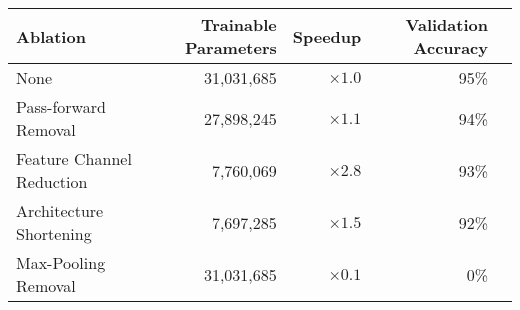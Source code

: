 \begin{tabular}{@{}lrrrr@{}}
\toprule
Ablation                  & Trainable Parameters & Speedup     & Validation Accuracy \\ \midrule
None                      & 31,031,685           & $\times1.0$ & 95\%                \\
Pass-forward Removal      & 27,898,245           & $\times1.1$ & 94\%                \\
Feature Channel Reduction & 7,760,069            & $\times2.8$ & 93\%                \\
Architecture Shortening   & 7,697,285            & $\times1.5$ & 92\%                \\
Max-Pooling Removal       & 31,031,685           & $\times0.1$ &  0\%                \\ \bottomrule
\end{tabular}